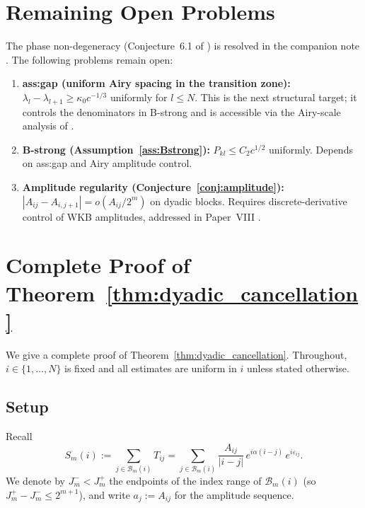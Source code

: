 \documentclass[12pt]{amsart}
\theoremstyle{definition}
\theoremstyle{remark}
\begin{document}
\section{Remaining Open Problems}
\label{sec:open}

The phase non-degeneracy (Conjecture~6.1 of \cite{paperVI})
is resolved in the companion note \cite{PhaseNondeg}.
The following problems remain open:

\begin{enumerate}[(O1)]
  \item \textbf{ass:gap (uniform Airy spacing in the transition zone):}
    $\lambda_l - \lambda_{l+1} \ge \kappa_0 c^{-1/3}$
    uniformly for $l \le N$.
    This is the next structural target;
    it controls the denominators in B-strong
    and is accessible via the Airy-scale analysis
    of \cite{PhaseNondeg}.

  \item \textbf{B-strong (Assumption~\ref{ass:Bstrong}):}
    $P_{kl} \le C_2 c^{1/2}$ uniformly.
    Depends on ass:gap and Airy amplitude control.

  \item \textbf{Amplitude regularity
    (Conjecture~\ref{conj:amplitude}):}
    $|A_{ij} - A_{i,j+1}| = o(A_{ij}/2^m)$ on dyadic blocks.
    Requires discrete-derivative control of WKB amplitudes,
    addressed in Paper~VIII \cite{paperVIII}.
\end{enumerate}

\appendix
\section{Complete Proof of Theorem~\ref{thm:dyadic_cancellation}}
\label{sec:appendix}

We give a complete proof of
Theorem~\ref{thm:dyadic_cancellation}.
Throughout, $i \in \{1,\dots,N\}$ is fixed and all estimates
are uniform in $i$ unless stated otherwise.

\subsection*{Setup}

Recall
\[
  S_m(i) := \sum_{j \in \mathcal{B}_m(i)} T_{ij}
  = \sum_{j \in \mathcal{B}_m(i)}
    \frac{A_{ij}}{|i-j|}\,e^{i\alpha(i-j)}\,e^{i\varepsilon_{ij}}.
\]
We denote by $J_m^- < J_m^+$ the endpoints of the index
range of $\mathcal{B}_m(i)$
(so $J_m^+ - J_m^- \leq 2^{m+1}$),
and write $a_j := A_{ij}$ for the amplitude sequence.
\end{document}
